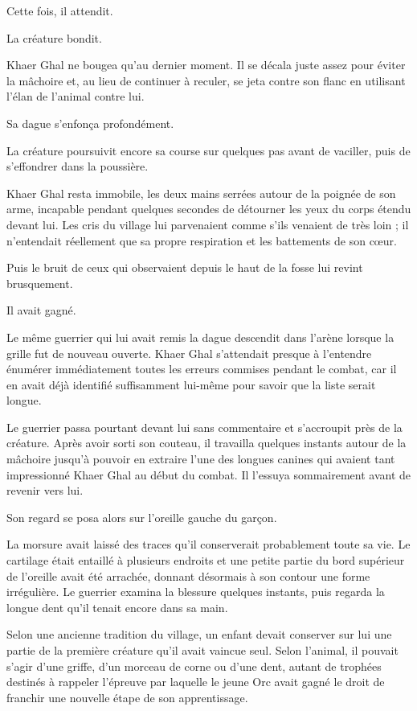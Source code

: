 Cette fois, il attendit.

La créature bondit.

Khaer Ghal ne bougea qu'au dernier moment. Il se décala juste assez pour éviter
la mâchoire et, au lieu de continuer à reculer, se jeta contre son flanc en
utilisant l'élan de l'animal contre lui.

Sa dague s'enfonça profondément.

La créature poursuivit encore sa course sur quelques pas avant de vaciller,
puis de s'effondrer dans la poussière.

Khaer Ghal resta immobile, les deux mains serrées autour de la poignée de son
arme, incapable pendant quelques secondes de détourner les yeux du corps
étendu devant lui. Les cris du village lui parvenaient comme s'ils venaient de
très loin ; il n'entendait réellement que sa propre respiration et les
battements de son cœur.

Puis le bruit de ceux qui observaient depuis le haut de la fosse lui revint
brusquement.

Il avait gagné.

\scenebreak

Le même guerrier qui lui avait remis la dague descendit dans l'arène lorsque
la grille fut de nouveau ouverte. Khaer Ghal s'attendait presque à l'entendre
énumérer immédiatement toutes les erreurs commises pendant le combat, car il
en avait déjà identifié suffisamment lui-même pour savoir que la liste serait
longue.

Le guerrier passa pourtant devant lui sans commentaire et s'accroupit près de
la créature. Après avoir sorti son couteau, il travailla quelques instants
autour de la mâchoire jusqu'à pouvoir en extraire l'une des longues canines
qui avaient tant impressionné Khaer Ghal au début du combat. Il l'essuya
sommairement avant de revenir vers lui.

Son regard se posa alors sur l'oreille gauche du garçon.

La morsure avait laissé des traces qu'il conserverait probablement toute sa
vie. Le cartilage était entaillé à plusieurs endroits et une petite partie du
bord supérieur de l'oreille avait été arrachée, donnant désormais à son
contour une forme irrégulière. Le guerrier examina la blessure quelques
instants, puis regarda la longue dent qu'il tenait encore dans sa main.

Selon une ancienne tradition du village, un enfant devait conserver sur lui
une partie de la première créature qu'il avait vaincue seul. Selon l'animal,
il pouvait s'agir d'une griffe, d'un morceau de corne ou d'une dent, autant de
trophées destinés à rappeler l'épreuve par laquelle le jeune Orc avait gagné
le droit de franchir une nouvelle étape de son apprentissage.

